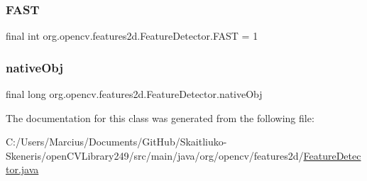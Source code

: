 \subsubsection{\texorpdfstring{F\+A\+ST}{FAST}}
{\footnotesize\ttfamily final int org.\+opencv.\+features2d.\+Feature\+Detector.\+F\+A\+ST = 1\hspace{0.3cm}{\ttfamily [static]}}

\mbox{\label{classorg_1_1opencv_1_1features2d_1_1_feature_detector_a6ab4158ea606cd45ed8a4b6d2d2e7be1}} 
\subsubsection{\texorpdfstring{native\+Obj}{nativeObj}}
{\footnotesize\ttfamily final long org.\+opencv.\+features2d.\+Feature\+Detector.\+native\+Obj\hspace{0.3cm}{\ttfamily [protected]}}



The documentation for this class was generated from the following file\+:\begin{DoxyCompactItemize}
\item 
C\+:/\+Users/\+Marcius/\+Documents/\+Git\+Hub/\+Skaitliuko-\/\+Skeneris/open\+C\+V\+Library249/src/main/java/org/opencv/features2d/\mbox{\hyperlink{_feature_detector_8java}{Feature\+Detector.\+java}}\end{DoxyCompactItemize}
